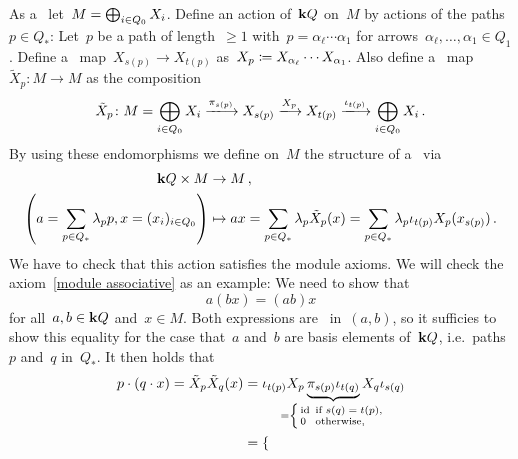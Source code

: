 \begin{remark}
\begin{enumerate}
      As a~{\module{$\kf$}} let~$M = \bigoplus_{i \in Q_0} X_i$.
      Define an action of~$\mathbf{k} Q$ on~$M$ by actions of the paths~$p \in Q_*$:
      Let~$p$ be a path of length~$\geq 1$ with~$p = \alpha_\ell \dotsm \alpha_1$ for arrows~$\alpha_\ell, \dotsc, \alpha_1 \in Q_1$.
      Define a~{\klin} map~$X_{s(p)} \to X_{t(p)}$ as~$X_p \coloneqq X_{\alpha_\ell} \dotsm X_{\alpha_1}$.
      Also define a~{\klin} map~$\tilde{X}_p \colon M \to M$ as the composition
      \[
          \tilde{X}_p
        \colon
          M
        =
          \bigdsum_{i \in Q_0} X_i
        \xlongto{\pi_{s(p)}}
          X_{s(p)}
        \xlongto{X_p}
          X_{t(p)}
        \xlongto{\iota_{t(p)}}
          \bigdsum_{i \in Q_0} X_i \,.
      \]
      By using these endomorphisms we define on~$M$ the structure of a~{} via
      \begin{align*}
              \mathbf{k} Q \times M
        &\to  M \,,
        \\
                  \left(
                    a = \sum_{p \in Q_*} \lambda_p p,
                    x = (x_i)_{i \in Q_0}
                  \right)
        &\mapsto  ax
         =        \sum_{p \in Q_*} \lambda_p \tilde{X}_p(x)
         =        \sum_{p \in Q_*} \lambda_p \iota_{t(p)} X_p( x_{s(p)} ) \,.
      \end{align*}
      We have to check that this action satisfies the module axioms.
      We will check the axiom~\ref{module associative} as an example:
      We need to show that
      \[
          a(bx)
        = (ab)x
      \]
      for all~$a, b \in \mathbf{k} Q$ and~$x \in M$.
      Both expressions are~{\kbilin} in~$(a,b)$, so it sufficies to show this equality for the case that~$a$ and~$b$ are basis elements of~$\mathbf{k} Q$, i.e.\ paths~$p$ and~$q$ in~$Q_*$.
      It then holds that
      \begin{align*}
          p \cdot (q \cdot x)
        = \tilde{X}_p \tilde{X}_q(x)
        &= \iota_{t(p)} X_p
          \underbrace{ \pi_{s(p)} \iota_{t(q)} }_{\mathclap{
            = \left\{
                \begingroup
                \renewcommand{\thickspace}{\kern 0.4em} %
                \begin{smallmatrix*}[l]
                  {\id} & \text{if~$s(q) = t(p)$},  \\
                  0     & \text{otherwise},
                \end{smallmatrix*}
                \endgroup
              \right.
          }}
          X_q \iota_{s(q)}
        \\
        &= \begin{cases}

\end{cases}
\end{align*}
\end{enumerate}
\end{remark}
